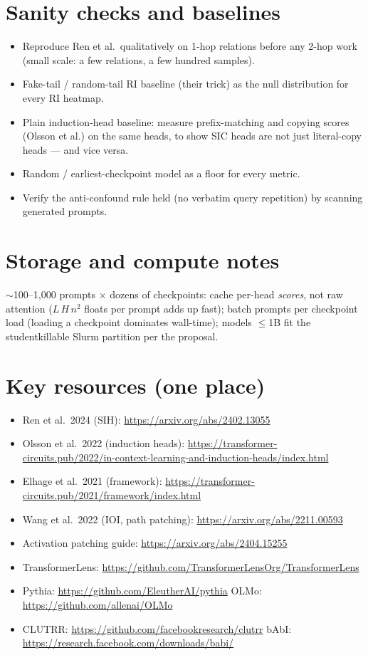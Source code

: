 \documentclass[11pt]{article}
\begin{document}
\section{Sanity checks and baselines}
\begin{itemize}[itemsep=2pt]
  \item Reproduce Ren et al.\ qualitatively on 1-hop relations before any 2-hop work (small scale: a few relations, a few hundred samples).
  \item Fake-tail / random-tail RI baseline (their trick) as the null distribution for every RI heatmap.
  \item Plain induction-head baseline: measure prefix-matching and copying scores (Olsson et al.) on the same heads, to show SIC heads are not just literal-copy heads --- and vice versa.
  \item Random / earliest-checkpoint model as a floor for every metric.
  \item Verify the anti-confound rule held (no verbatim query repetition) by scanning generated prompts.
\end{itemize}

\section{Storage and compute notes}
$\sim$100--1{,}000 prompts $\times$ dozens of checkpoints: cache per-head \emph{scores}, not raw attention ($L\,H\,n^2$ floats per prompt adds up fast); batch prompts per checkpoint load (loading a checkpoint dominates wall-time); models $\leq$1B fit the studentkillable Slurm partition per the proposal.

\section{Key resources (one place)}
\begin{itemize}[itemsep=1pt]
  \item Ren et al.\ 2024 (SIH): \url{https://arxiv.org/abs/2402.13055}
  \item Olsson et al.\ 2022 (induction heads): \url{https://transformer-circuits.pub/2022/in-context-learning-and-induction-heads/index.html}
  \item Elhage et al.\ 2021 (framework): \url{https://transformer-circuits.pub/2021/framework/index.html}
  \item Wang et al.\ 2022 (IOI, path patching): \url{https://arxiv.org/abs/2211.00593}
  \item Activation patching guide: \url{https://arxiv.org/abs/2404.15255}
  \item TransformerLens: \url{https://github.com/TransformerLensOrg/TransformerLens}
  \item Pythia: \url{https://github.com/EleutherAI/pythia} \quad OLMo: \url{https://github.com/allenai/OLMo}
  \item CLUTRR: \url{https://github.com/facebookresearch/clutrr} \quad bAbI: \url{https://research.facebook.com/downloads/babi/}
\end{itemize}
\end{document}
